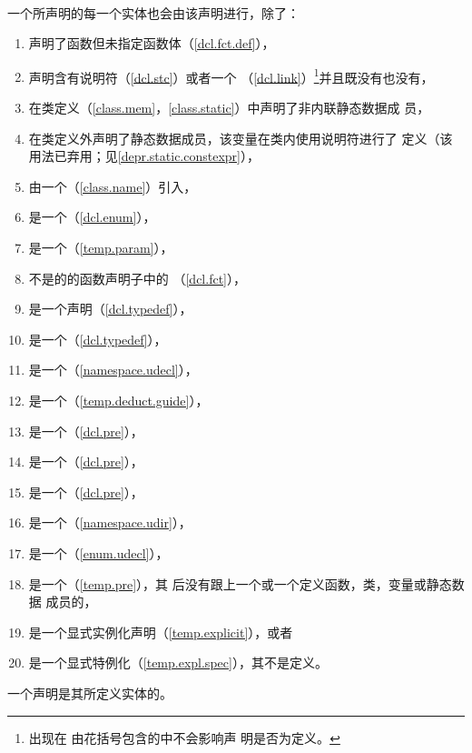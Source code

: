 \paragraph{} %
一个所声明的每一个实体也会由该声明进行，除了：
\begin{enumerate}
  \item 声明了函数但未指定函数体（\ref{dcl.fct.def}），
  \item 声明含有说明符（\ref{dcl.stc}）或者一个
        （\ref{dcl.link}）\footnote{出现在
        由花括号包含的中不会影响声
        明是否为定义。}并且既没有也没有，
  \item 在类定义（\ref{class.mem}，\ref{class.static}）中声明了非内联静态数据成
        员，
  \item 在类定义外声明了静态数据成员，该变量在类内使用说明符进行了
        定义（该用法已弃用；见\ref{depr.static.constexpr}），
  \item 由一个（\ref{class.name}）引入，
  \item 是一个（\ref{dcl.enum}），
  \item 是一个（\ref{temp.param}），
  \item 不是的的函数声明子中的
        （\ref{dcl.fct}），
  \item 是一个声明（\ref{dcl.typedef}），
  \item 是一个（\ref{dcl.typedef}），
  \item 是一个（\ref{namespace.udecl}），
  \item 是一个（\ref{temp.deduct.guide}），
  \item 是一个（\ref{dcl.pre}），
  \item 是一个（\ref{dcl.pre}），
  \item 是一个（\ref{dcl.pre}），
  \item 是一个（\ref{namespace.udir}），
  \item 是一个（\ref{enum.udecl}），
  \item 是一个（\ref{temp.pre}），其
        后没有跟上一个或一个定义函数，类，变量或静态数据
        成员的，
  \item 是一个显式实例化声明（\ref{temp.explicit}），或者
  \item 是一个显式特例化（\ref{temp.expl.spec}），其不是定义。
\end{enumerate}
一个声明是其所定义实体的。

